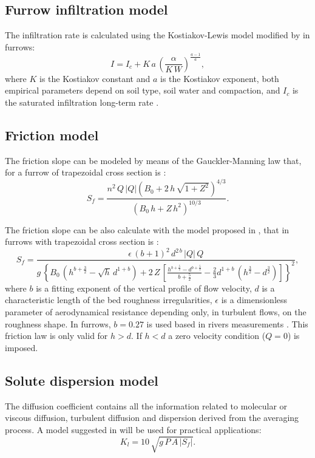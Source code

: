 \documentclass[review,authoryear]{elsarticle}
\newcommand{\eq}[2]{\begin{equation}\label{#2}#1\end{equation}}
\newcommand{\PA}[1] {\left(#1\right)}
\newcommand{\C}[1] {\left[#1\right]}
\newcommand{\LL}[1] {\left\{#1\right\}}
\newcommand{\ABS}[1] {\left|#1\right|}
\begin{document}
\subsection{Furrow infiltration model}

The infiltration rate is calculated using the Kostiakov-Lewis model modified by
\cite{JaviSurcos1} in furrows:
\eq{I=I_c+K\,a\,\PA{\frac{\alpha}{K\,W}}^\frac{a-1}{a},}
{EqKostiakovLewisSurcosi}
where $K$ is the Kostiakov constant and $a$ is the Kostiakov exponent, both
empirical parameters depend on soil type, soil water and compaction, and $I_c$
is the saturated infiltration long-term rate \citep{WalkerSkogerboe87}.

\subsection{Friction model}

The friction slope can be modeled by means of the Gauckler-Manning law
\citep{Gauckler,Manning} that, for a furrow of trapezoidal cross section is
\citep{JaviSurcos1}:
\eq
{
	S_f=\frac{n^2\,Q\,|Q|\PA{B_0+2\,h\,\sqrt{1+Z^2}}^{4/3}}
	{\PA{B_0\,h+Z\,h^2}^{10/3}}.
}{EqManning}

The friction slope can be also calculate with the model proposed in
\cite{JaviFriccion,JaviFriccion2}, that in furrows with trapezoidal cross
section is \citep{JaviSurcos1}:
\eq
{
	S_f=\frac{\epsilon\,(b+1)^2\,d^{2\,b}\,|Q|\,Q}
	{g\,\LL{B_0\,\PA{h^{b+\frac32}-\sqrt{h}\,d^{1+b}}+
	2\,Z\,\C{\frac{h^{b+\frac52}-d^{b+\frac52}}{b+\frac52}-
	\frac{2}{3}d^{1+b}\,\PA{h^\frac32-d^\frac32}}}^2},
}{EqSf}
where $b$ is a fitting exponent of the vertical profile of flow velocity, $d$ is
a characteristic length of the bed roughness irregularities, $\epsilon$ is a
dimensionless parameter of aerodynamical resistance depending only, in turbulent
flows, on the roughness shape. In furrows, $b=0.27$ is used based in rivers
measurements \citep{JaviFriccion}. This friction law is only valid for $h>d$. If
$h<d$ a zero velocity condition ($Q=0$) is imposed.

\subsection{Solute dispersion model}

The diffusion coefficient contains all the information related to molecular or
viscous diffusion, turbulent diffusion and dispersion derived from the averaging
process. A model suggested in \cite{Rutherford94} will be used for practical
applications:
\eq{K_l=10\,\sqrt{g\,P\,A\,\ABS{S_f}}.}{EqRutherford}
\end{document}
